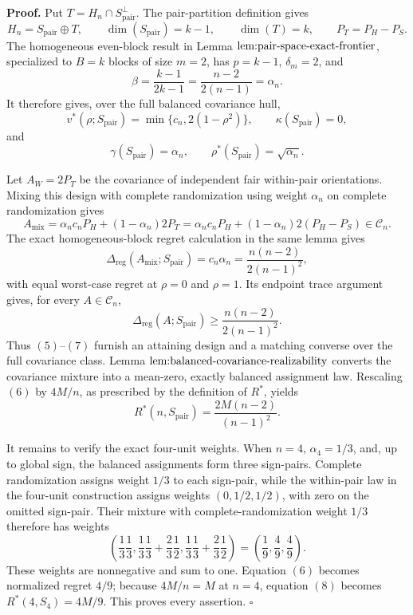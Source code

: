 \textbf{Proof.}
Put \(T=H_n\cap S_{\mathrm{pair}}^\perp\).  The pair-partition definition gives
\[
H_n=S_{\mathrm{pair}}\mathbin\oplus T,
\qquad
\dim(S_{\mathrm{pair}})=k-1,
\qquad
\dim(T)=k,
\qquad
P_T=P_H-P_S.
\tag{1}
\]
The homogeneous even-block result in Lemma \(\text{\rm lem:pair-space-exact-frontier}\), specialized to \(B=k\) blocks of size \(m=2\), has \(p=k-1\), \(\delta_m=2\), and
\[
\beta=\frac{k-1}{2k-1}
=\frac{n-2}{2(n-1)}=\alpha_n.
\tag{2}
\]
It therefore gives, over the full balanced covariance hull,
\[
v^*(\rho;S_{\mathrm{pair}})
=\min\{c_n,2(1-\rho^2)\},
\qquad
\kappa(S_{\mathrm{pair}})=0,
\tag{3}
\]
and
\[
\gamma(S_{\mathrm{pair}})=\alpha_n,
\qquad
\rho^*(S_{\mathrm{pair}})=\sqrt{\alpha_n}.
\tag{4}
\]

Let \(A_W=2P_T\) be the covariance of independent fair within-pair orientations.  Mixing this design with complete randomization using weight \(\alpha_n\) on complete randomization gives
\[
A_{\mathrm{mix}}
=\alpha_nc_nP_H+(1-\alpha_n)2P_T
=\alpha_nc_nP_H+(1-\alpha_n)2(P_H-P_S)
\in\mathcal C_n.
\tag{5}
\]
The exact homogeneous-block regret calculation in the same lemma gives
\[
\Delta_{\mathrm{reg}}(A_{\mathrm{mix}};S_{\mathrm{pair}})
=c_n\alpha_n
=\frac{n(n-2)}{2(n-1)^2},
\tag{6}
\]
with equal worst-case regret at \(\rho=0\) and \(\rho=1\).  Its endpoint trace argument gives, for every \(A\in\mathcal C_n\),
\[
\Delta_{\mathrm{reg}}(A;S_{\mathrm{pair}})
\geq\frac{n(n-2)}{2(n-1)^2}.
\tag{7}
\]
Thus \((5)\)--\((7)\) furnish an attaining design and a matching converse over the full covariance class.  Lemma \(\text{\rm lem:balanced-covariance-realizability}\) converts the covariance mixture into a mean-zero, exactly balanced assignment law.  Rescaling \((6)\) by \(4M/n\), as prescribed by the definition of \(R^*\), yields
\[
R^*(n,S_{\mathrm{pair}})
=\frac{2M(n-2)}{(n-1)^2}.
\tag{8}
\]

It remains to verify the exact four-unit weights.  When \(n=4\), \(\alpha_4=1/3\), and, up to global sign, the balanced assignments form three sign-pairs.  Complete randomization assigns weight \(1/3\) to each sign-pair, while the within-pair law in the four-unit construction assigns weights \((0,1/2,1/2)\), with zero on the omitted sign-pair.  Their mixture with complete-randomization weight \(1/3\) therefore has weights
\[
\left(
\frac13\frac13,
\frac13\frac13+\frac23\frac12,
\frac13\frac13+\frac23\frac12
\right)
=\left(\frac19,\frac49,\frac49\right).
\tag{9}
\]
These weights are nonnegative and sum to one.  Equation \((6)\) becomes normalized regret \(4/9\); because \(4M/n=M\) at \(n=4\), equation \((8)\) becomes \(R^*(4,S_4)=4M/9\).  This proves every assertion. \(\square\)